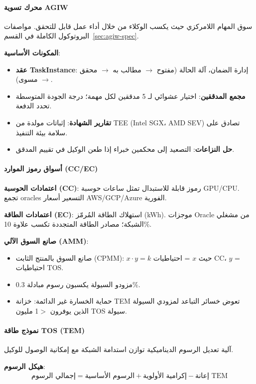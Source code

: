 \documentclass[11pt]{article}
\begin{document}
\paragraph{محرك تسوية AGIW}
سوق المهام اللامركزي حيث يكسب الوكلاء من خلال أداء عمل قابل للتحقق. مواصفات البروتوكول الكاملة في القسم~\ref{sec:agiw-spec}.

\textbf{المكونات الأساسية}:
\begin{itemize}[noitemsep]
  \item \textbf{عقد TaskInstance}: إدارة الضمان، آلة الحالة (مفتوح $\to$ مطالب به $\to$ محقق $\to$ مسوى).
  \item \textbf{مجمع المدققين}: اختيار عشوائي لـ 5 مدققين لكل مهمة؛ درجة الجودة المتوسطة تحدد الدفعة.
  \item \textbf{تقارير الشهادة}: إثباتات مولدة من TEE (Intel SGX، AMD SEV) تصادق على سلامة بيئة التنفيذ.
  \item \textbf{حل النزاعات}: التصعيد إلى محكمين خبراء إذا طعن الوكيل في تقييم المدقق.
\end{itemize}

\paragraph{أسواق رموز الموارد (CC/EC)}
\textbf{اعتمادات الحوسبة (CC)}: رموز قابلة للاستبدال تمثل ساعات حوسبة GPU/CPU. تجمع oracles التسعير أسعار AWS/GCP/Azure الفورية.

\textbf{اعتمادات الطاقة (EC)}: استهلاك الطاقة المُرمّز (kWh). موجزات Oracle من مشغلي الشبكة؛ مصادر الطاقة المتجددة تكسب علاوة 10\%.

\textbf{صانع السوق الآلي (AMM)}:
\begin{itemize}[noitemsep]
  \item صانع السوق بالمنتج الثابت (CPMM): $x \cdot y = k$ حيث $x$ = احتياطيات CC، $y$ = احتياطيات TOS.
  \item مزودو السيولة يكسبون رسوم مبادلة 0.3\%.
  \item حماية الخسارة غير الدائمة: خزانة TEM تعوض خسائر التباعد لمزودي السيولة الذين يوفرون $>$1 مليون TOS سيولة.
\end{itemize}

\paragraph{نموذج طاقة TOS (TEM)}
آلية تعديل الرسوم الديناميكية توازن استدامة الشبكة مع إمكانية الوصول للوكيل.

\textbf{هيكل الرسوم}:
\begin{equation}
\text{إجمالي الرسوم} = \text{الرسوم الأساسية} + \text{إكرامية الأولوية} - \text{إعانة TEM}
\end{equation}
\end{document}
